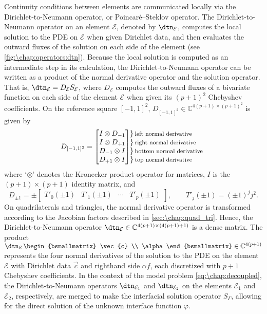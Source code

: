 Continuity conditions between elements are communicated locally via the Dirichlet-to-Neumann operator, or Poincar\'{e}--Steklov operator. The Dirichlet-to-Neumann operator on an element $\mathcal{E}$, denoted by $\dtn_\mathcal{E}$, computes the local solution to the PDE on $\mathcal{E}$ when given Dirichlet data, and then evaluates the outward fluxes of the solution on each side of the element (see \cref{fig:\chap:operators:dtn}). Because the local solution is computed as an intermediate step in its calculation, the Dirichlet-to-Neumann operator can be written as a product of the normal derivative operator and the solution operator. That is, $\dtn_\mathcal{E} = D_\mathcal{E} S_\mathcal{E}$, where $D_\mathcal{E}$ computes the outward fluxes of a bivariate function on each side of the element $\mathcal{E}$ when given its $(p+1)^2$ Chebyshev coefficients. On the reference square $[-1,1]^2$, $D_{[-1,1]^2} \in \mathbb{C}^{4(p+1) \times (p+1)^2}$ is given by
\[
D_{[-1,1]^2}
=
\begin{bmatrix}
I \otimes D_{-1} \\
I \otimes D_{+1} \\
D_{-1} \otimes I \\
D_{+1} \otimes I
\end{bmatrix}%
\!\!\!\!
\begin{array}{l}
\}\,\text{\footnotesize left normal derivative} \\
\}\,\text{\footnotesize right normal derivative} \\
\}\,\text{\footnotesize bottom normal derivative} \\
\}\,\text{\footnotesize top normal derivative}
\end{array}
\]
where `$\otimes$' denotes the Kronecker product operator for matrices, $I$ is the $(p+1) \times (p+1)$ identity matrix, and
\[
D_{\pm 1}
= \pm
\begin{bmatrix}
T'_0(\pm1) & T'_1(\pm1) & \cdots & T'_p(\pm1)\end{bmatrix}, \qquad T'_j(\pm1)= (\pm1)^j j^2.
\]
On quadrilaterals and triangles, the normal derivative operator is transformed according to the Jacobian factors described in \cref{sec:\chap:quad_tri}. Hence, the Dirichlet-to-Neumann operator $\dtn_\mathcal{E} \in \mathbb{C}^{4(p+1) \times (4(p+1)+1)}$ is a dense matrix. The product $\dtn_\mathcal{E} \,\begin{bsmallmatrix} \vec{c} \\ \alpha \end{bsmallmatrix} \in \mathbb{C}^{4(p+1)}$ represents the four normal derivatives of the solution to the PDE on the element $\mathcal{E}$ with Dirichlet data $\vec{c}$ and righthand side $\alpha f$, each discretized with $p+1$ Chebyshev coefficients. In the context of the model problem \cref{eq:\chap:decoupled}, the Dirichlet-to-Neumann operators $\dtn_{\mathcal{E}_1}$ and $\dtn_{\mathcal{E}_2}$ on the elements $\mathcal{E}_1$ and $\mathcal{E}_2$, respectively, are merged to make the interfacial solution operator $S_\Gamma$, allowing for the direct solution of the unknown interface function $\varphi$.


